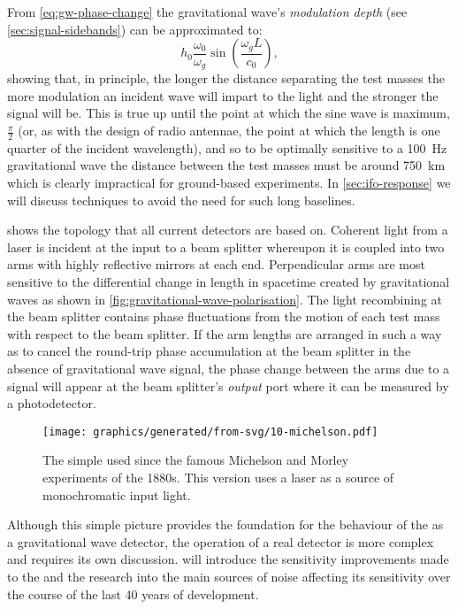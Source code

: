 From \cref{eq:gw-phase-change} the gravitational wave's \emph{modulation depth} (see \cref{sec:signal-sidebands}) can be approximated to:
\begin{equation}
  \label{eq:gw-mod-depth}
  h_0 \frac{\omega_0}{\omega_g} \sin \left( \frac{\omega_g L}{c_0} \right),
\end{equation}
showing that, in principle, the longer the distance separating the test masses the more modulation an incident wave will impart to the light and the stronger the signal will be. This is true up until the point at which the sine wave is maximum, $\frac{\pi}{2}$ (or, as with the design of radio antennae, the point at which the length is one quarter of the incident wavelength), and so to be optimally sensitive to a \SI{100}{\hertz} gravitational wave the distance between the test masses must be around \SI{750}{\kilo\meter} which is clearly impractical for ground-based experiments. In \cref{sec:ifo-response} we will discuss techniques to avoid the need for such long baselines.

 shows the \MI{} topology that all current detectors are based on. Coherent light from a laser is incident at the input to a beam splitter whereupon it is coupled into two arms with highly reflective mirrors at each end. Perpendicular arms are most sensitive to the differential change in length in spacetime created by gravitational waves as shown in \cref{fig:gravitational-wave-polarisation}. The light recombining at the beam splitter contains phase fluctuations from the motion of each test mass with respect to the beam splitter. If the arm lengths are arranged in such a way as to cancel the round-trip phase accumulation at the beam splitter in the absence of gravitational wave signal, the phase change between the arms due to a signal will appear at the beam splitter's \emph{output} port where it can be measured by a photodetector.

\begin{figure}
  \centering
  \texttt{[image: graphics/generated/from-svg/10-michelson.pdf]}
  \caption[Simple \MI{}]{\label{fig:mi}The simple \MI{} used since the famous Michelson and Morley experiments of the 1880s. This version uses a laser as a source of monochromatic input light.}
\end{figure}

Although this simple picture provides the foundation for the behaviour of the \MI{} as a gravitational wave detector, the operation of a real detector is more complex and requires its own discussion.  will introduce the sensitivity improvements made to the \MI{} and the research into the main sources of noise affecting its sensitivity over the course of the last \num{40} years of development.

